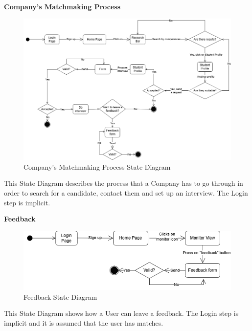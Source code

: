 \textbf{Company's Matchmaking Process}\newline
\begin{figure}[H]
    \centering
    \includegraphics[width=15cm]{Images/State_Diagrams/RASD-SD-Matchmaking.drawio.png}
    \caption{Company's Matchmaking Process State Diagram}
\end{figure}
This State Diagram describes the process that a Company has to go through in order to search for a candidate, contact them and set up an interview. The Login step is implicit.
\newline

\textbf{Feedback}\newline
\begin{figure}[H]
    \centering
    \includegraphics[width=15cm]{Images/State_Diagrams/RASD-SD-Feedback.drawio.png}
    \caption{Feedback State Diagram}
\end{figure}
This State Diagram shows how a User can leave a feedback. The Login step is implicit and it is assumed that the user has matches.
\newline

